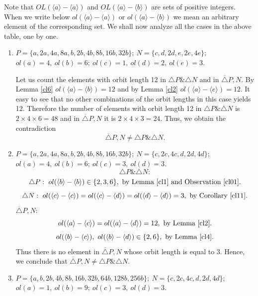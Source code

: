{{{Note that $OL(\langle a \rangle - \langle a \rangle)$ and $OL( \langle a \rangle - \langle b \rangle)$ are sets 
of positive integers.  When we
write below $ol(\langle a \rangle - \langle a \rangle)$ or $ol(\langle a \rangle - \langle b \rangle)$ we mean an arbitrary element of the  
corresponding set. We shall now analyze all the cases in the above table, one by one.

\begin{enumerate}
  \item  $ P=\{a,2a,4a,8a,b,2b,4b,8b,16b,32b\}; \  N=\{c,d,2d,e,2e,4e\} $; \\  
	 $ ol(a)=4, \ ol(b)=6; \  ol(c)=1, \  ol(d)=2,\  ol(e)=3 $.

	 Let us count the elements with orbit length 12 in $ \triangle P \& \triangle N$ and 
	 in $ \overline{\triangle}P,N$.               
	 By Lemma \ref{cl6} 
	   $ ol(\langle a \rangle - \langle b \rangle)=12 $ and by Lemma \ref{cl2} $ ol(\langle a \rangle - \langle e \rangle)=12 $. 
	 It easy to see that no other combinations of the orbit lengths in this case yields 12. Therefore the number of elements with orbit length 12 in $\triangle P \& \triangle N$ is 
 $2 \times 4 \times 6=48$ and in $\overline{\triangle}P,N$ it is $2 \times 4 \times 3=24$.
	  Thus, we obtain the contradiction
	$$ \overline{\triangle}P,N \neq \triangle P \& \triangle N.$$
  
  \item  $ P=\{a,2a,4a,8a,b,2b,4b,8b,16b,32b\}; \  N=\{c,2c,4c,d,2d,4d\} $; \\  
	 $ ol(a)=4, \ ol(b)=6; \  ol(c)=3, \  ol(d)=3 $.
	 $$\triangle P \& \triangle N:$$
	 $$\triangle P : \ 
	  ol(\langle b \rangle - \langle b \rangle) \in \{2,3,6\}, \mbox{ by Lemma \ref{cl1} and Observation \ref{cl01}}.$$
	 $$\triangle N :  \  
	 ol(\langle c \rangle - \langle c \rangle)=ol(\langle c \rangle - \langle d \rangle)=ol(\langle d \rangle - \langle d \rangle)=3, \mbox{ by Corollary \ref{cl11}}.$$
	 $ \overline{\triangle} P,N$: 
	 $$ ol(\langle a \rangle - \langle c \rangle)=ol(\langle a \rangle - \langle d \rangle)=12,  \mbox{ by Lemma \ref{cl2}} .$$
	 $$ ol(\langle b \rangle - \langle c \rangle), \ ol(\langle b \rangle - \langle d \rangle) \in \{2,6\},  \mbox{ by Lemma \ref{cl4}}.$$
	 Thus there is no element in $ \overline{\triangle} P,N$  whose orbit length is equal to 3.
	 Hence, we conclude that $ \overline{\triangle} P,N  \neq \triangle P \& \triangle N $.\\

  \item  $ P=\{a,b,2b,4b,8b,16b,32b,64b,128b,256b\}; \  N=\{c,2c,4c,d,2d,4d\} $; \\  
	 $ ol(a)=1, \ ol(b)=9; \  ol(c)=3, \  ol(d)=3 $.
	 

\end{enumerate}}}}
